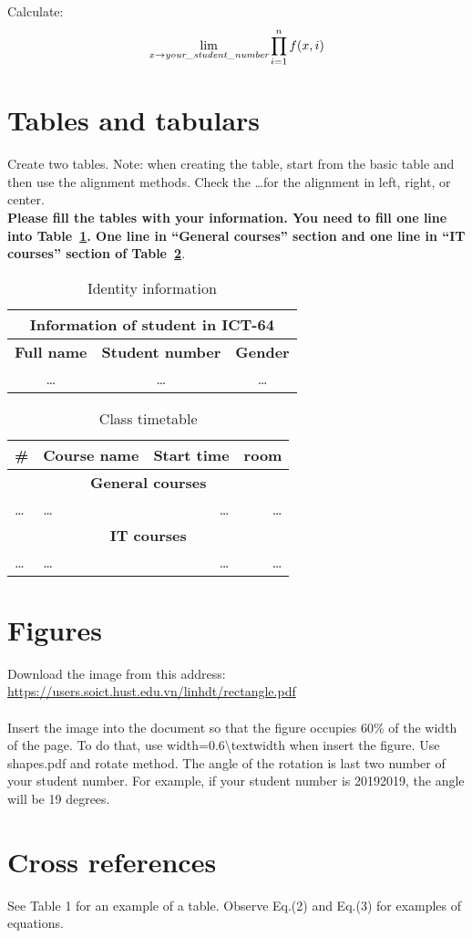 \documentclass{article}
\begin{document}
Calculate:
\begin{equation}
    \label{eq:ct3}
    \lim_{x\to \emph{your\textunderscore student\textunderscore number}}{\prod_{i=1}^{n}f(x,i)}
\end{equation}
\section{Tables and tabulars}
Create two tables. Note: when creating the table, start from the basic table
and then use the alignment methods. Check the \ldots for the alignment in left,
right, or center.\\
\textbf{Please fill the tables with your information. You need to fill one
line into Table~\ref{tab:1}. One line in “General courses” section and one line
in “IT courses” section of Table~\ref{tab:2}}.
\begin{table}[tbh]
    \centering
    \caption{Identity information}
    \begin{tabular}{|c|c|c|}
        \hline 
        \multicolumn{3}{|c|}{\textbf{Information of student in ICT-64}}\\
        \hline \hline
        \textbf{Full name} & \textbf{Student number} & \textbf{Gender}\\
        \hline
        \ldots & \ldots & \ldots \\
        \hline
    \end{tabular}
    \label{tab:1}
\end{table}
\begin{table}[tbh]
    \centering
    \caption{Class timetable}
    \begin{tabular}{|l|l|r|r|}
        \hline
        \textbf{\#} & \textbf{Course name} & \textbf{Start time} & \textbf{room} \\
        \hline \hline
        \multicolumn{4}{|c|}{\textbf{General courses}}\\
        \hline
        \ldots & \ldots & \ldots & \ldots\\
        \hline
        \hline
        \multicolumn{4}{|c|}{\textbf{IT courses}}\\
        \hline
        \ldots & \ldots & \ldots & \ldots\\
        \hline
    \end{tabular}
    \label{tab:2}
\end{table}
\section{Figures}
Download the image from this address:
\url{https://users.soict.hust.edu.vn/linhdt/rectangle.pdf} \\ \\
\indent Insert the image into the document so that the figure occupies 60\% of the width of the page. To do that, use width=0.6\textbackslash textwidth when insert the figure.
\indent Use shapes.pdf and rotate method. The angle of the rotation is last two number of your student number. For example, if your student number is 20192019,
the angle will be 19 degrees.

\section{Cross references}
See Table 1 for an example of a table. Observe Eq.(2) and Eq.(3) for examples
of equations.
\pagebreak
\tableofcontents
\listoftables
\end{document}
